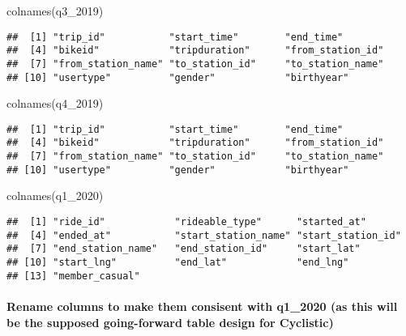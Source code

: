 \documentclass[
]{article}
\newenvironment{Shaded}{\begin{snugshade}}{\end{snugshade}}
\newcommand{\FunctionTok}[1]{\textcolor[rgb]{0.00,0.00,0.00}{#1}}
\newcommand{\NormalTok}[1]{#1}
\begin{document}
\begin{Shaded}
\begin{Highlighting}[]
\FunctionTok{colnames}\NormalTok{(q3\_2019)}
\end{Highlighting}
\end{Shaded}

\begin{verbatim}
##  [1] "trip_id"           "start_time"        "end_time"         
##  [4] "bikeid"            "tripduration"      "from_station_id"  
##  [7] "from_station_name" "to_station_id"     "to_station_name"  
## [10] "usertype"          "gender"            "birthyear"
\end{verbatim}

\begin{Shaded}
\begin{Highlighting}[]
\FunctionTok{colnames}\NormalTok{(q4\_2019)}
\end{Highlighting}
\end{Shaded}

\begin{verbatim}
##  [1] "trip_id"           "start_time"        "end_time"         
##  [4] "bikeid"            "tripduration"      "from_station_id"  
##  [7] "from_station_name" "to_station_id"     "to_station_name"  
## [10] "usertype"          "gender"            "birthyear"
\end{verbatim}

\begin{Shaded}
\begin{Highlighting}[]
\FunctionTok{colnames}\NormalTok{(q1\_2020)}
\end{Highlighting}
\end{Shaded}

\begin{verbatim}
##  [1] "ride_id"            "rideable_type"      "started_at"        
##  [4] "ended_at"           "start_station_name" "start_station_id"  
##  [7] "end_station_name"   "end_station_id"     "start_lat"         
## [10] "start_lng"          "end_lat"            "end_lng"           
## [13] "member_casual"
\end{verbatim}

\hypertarget{rename-columns-to-make-them-consisent-with-q1_2020-as-this-will-be-the-supposed-going-forward-table-design-for-cyclistic}{%
\paragraph{Rename columns to make them consisent with q1\_2020 (as this
will be the supposed going-forward table design for
Cyclistic)}\label{rename-columns-to-make-them-consisent-with-q1_2020-as-this-will-be-the-supposed-going-forward-table-design-for-cyclistic}}
\end{document}
